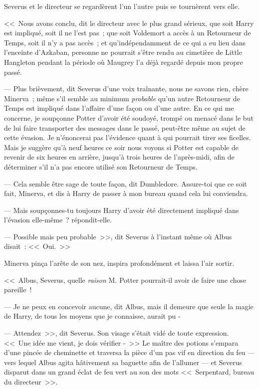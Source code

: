 Severus et le directeur se regardèrent l'un l'autre puis se tournèrent vers elle.

<<~Nous avons conclu, dit le directeur avec le plus grand sérieux, que soit Harry est impliqué, soit il ne l'est pas~; que soit Voldemort a accès à un Retourneur de Temps, soit il n'y a pas accès~; et qu'indépendamment de ce qui a eu lieu dans l'enceinte d'Azkaban, personne ne pourrait s'être rendu au cimetière de Little Hangleton pendant la période où Maugrey l'a déjà regardé depuis mon propre passé.

--- Plus brièvement, dit Severus d'une voix traînante, nous ne savons rien, chère Minerva~; même s'il semble au minimum \emph{probable} qu'un autre Retourneur de Temps est impliqué dans l'affaire d'une façon ou d'une autre. En ce qui me concerne, je soupçonne Potter d'avoir été soudoyé, trompé ou menacé dans le but de lui faire transporter des messages dans le passé, peut-être même au sujet de cette évasion. Je n'énoncerai pas l'évidence quant à qui pourrait tirer ses ficelles. Mais je suggère qu'à neuf heures ce soir nous voyons si Potter est capable de revenir de six heures en arrière, jusqu'à trois heures de l'après-midi, afin de déterminer s'il n'a pas encore utilisé son Retourneur de Temps.

--- Cela semble être sage de toute façon, dit Dumbledore. Assure-toi que ce soit fait, Minerva, et dis à Harry de passer à mon bureau quand cela lui conviendra.

--- Mais soupçonnes-tu toujours Harry d'avoir été directement impliqué dans l'évasion elle-même~? répondit-elle.

--- Possible mais peu probable~>>, dit Severus à l'instant même où Albus disait~: <<~Oui.~>>

Minerva pinça l'arête de son nez, inspira profondément et laissa l'air sortir.

<<~Albus, Severus, quelle \emph{raison} M. Potter pourrait-il avoir de faire une chose pareille~!

--- Je ne peux en concevoir aucune, dit Albus, mais il demeure que seule la magie de Harry, de tous les moyens que je connaisse, aurait pu -

--- Attendez~>>, dit Severus. Son visage s'était vidé de toute expression. <<~Une idée me vient, je dois vérifier -~>> Le maître des potions s'empara d'une pincée de cheminette et traversa la pièce d'un pas vif en direction du feu — vers lequel Albus agita hâtivement sa baguette afin de l'allumer — et Severus disparut dans un grand éclat de feu vert au son des mots <<~Serpentard, bureau du directeur~>>.

